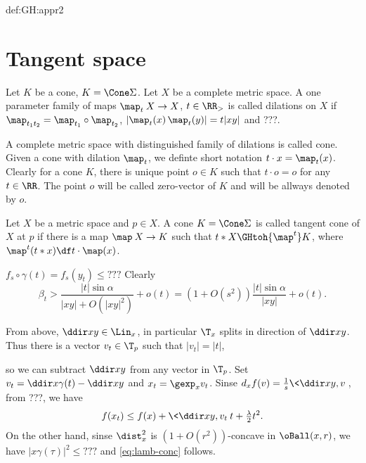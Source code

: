 {\begin{subthm}{def:GH:appr2}
\section{Tangent space}

Let $K$ be a cone, $K=\Cone \Sigma$.
Let $X$ be a complete metric space.
A one parameter family of maps 
$\map_t\:X\to X$, $t\in\RR_>$ is called dilations on $X$ if
$\map_{t_1t_2}=\map_{t_1}\circ\map_{t_2}$,
$|\map_t(x)\,\map_t(y)|=t|xy|$ and ???.

A complete metric space with distinguished family of dilations is called cone. 
Given a cone with dilation $\map_t$, 
we definte short notation $t\cdot x=\map_t(x)$.
Clearly for a cone $K$,
there is unique point $o\in K$ such that $t\cdot o=o$ for any $t\in \RR$.
The point $o$ will be called zero-vector of $K$ and will be allways denoted by $o$.

Let $X$ be a metric space and $p\in X$.
A cone $K=\Cone\Sigma$ is called tangent cone of $X$ at $p$ if there is a map $\map\:X\to K$
such that $t*X\GHtoh{\map^t} K$, where $\map^t(t*x)\df t\cdot\map(x)$.

















$f_s\circ\gamma(t)=f_s(y_t)\le ???$
Clearly 
$$\beta_t
>\frac{|t|\sin\alpha}{|xy|+O(|xy|^2)}+o(t)
=(1+O(s^2))\frac{|t|\sin\alpha}{|xy|}+o(t).$$

From above,  $\ddir x y\in\Lin_x$, in particular $\T_x$ splits in direction of $\ddir x y$.
Thus there is a vector $v_t\in\T_p$ such that $|v_t|=|t|$, 


so we can subtract $\ddir x y$ from any vector in $\T_p$.
Set $v_t=\ddir x{\gamma(t)}-\ddir x y$ and $x_t=\gexp_x v_t$.
Sinse $d_xf(v)=\tfrac1s\<\ddir xy,v\>$, from ???, we have
$$f(x_t)\le f(x)+\<\ddir x y,v_t\>t+\tfrac\lambda2t^2.$$
On the other hand, sinse $\dist^2_x$ is $(1+O(r^2))$-concave in $\oBall(x,r)$, we have
$|x\gamma(\tau)|^2\le ???$
and \ref{eq:lamb-conc} follows.


























\end{subthm}}
